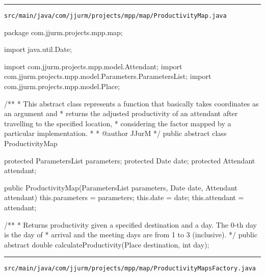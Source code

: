\noindent\rule{\textwidth}{0.4pt}

\nointerlineskip
\texttt{src/main/java/com/jjurm/projects/mpp/map/ProductivityMap.java}

\begin{javacode}
package com.jjurm.projects.mpp.map;

import java.util.Date;

import com.jjurm.projects.mpp.model.Attendant;
import com.jjurm.projects.mpp.model.Parameters.ParametersList;
import com.jjurm.projects.mpp.model.Place;

/**
 * This abstract class represents a function that basically takes coordinates as an argument and
 * returns the adjusted productivity of an attendant after travelling to the specified location,
 * considering the factor mapped by a particular implementation.
 * 
 * @author JJurM
 */
public abstract class ProductivityMap {

  protected ParametersList parameters;
  protected Date date;
  protected Attendant attendant;

  public ProductivityMap(ParametersList parameters, Date date, Attendant attendant) {
    this.parameters = parameters;
    this.date = date;
    this.attendant = attendant;
  }

  /**
   * Returns productivity given a specified destination and a day. The 0-th day is the day of
   * arrival and the meeting days are from 1 to 3 (inclusive).
   */
  public abstract double calculateProductivity(Place destination, int day);

}
\end{javacode}

\noindent\rule{\textwidth}{0.4pt}

\nointerlineskip
\texttt{src/main/java/com/jjurm/projects/mpp/map/ProductivityMapsFactory.java}

